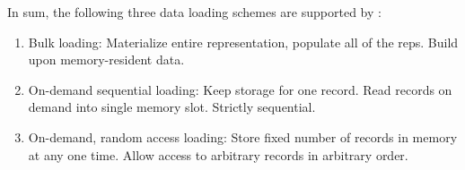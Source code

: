 {In sum, the following three data loading schemes are supported by \padx:

\begin{enumerate}
\item Bulk loading: Materialize entire \pads{} representation, populate all
  of the \pads reps. Build \padx \condm upon memory-resident data.

\item On-demand sequential loading: Keep storage for one record. Read
  records on demand into single memory slot. Strictly sequential.

\item On-demand, random access loading: Store fixed number of records in
  memory at any one time. Allow access to arbitrary records in
  arbitrary order.
\end{enumerate}
}